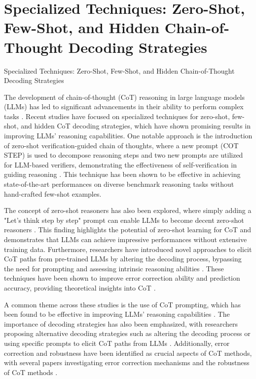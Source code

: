 \documentclass[conference]{IEEEtran}
\begin{document}
\section{Specialized Techniques: Zero-Shot, Few-Shot, and Hidden Chain-of-Thought Decoding Strategies}
Specialized Techniques: Zero-Shot, Few-Shot, and Hidden Chain-of-Thought Decoding Strategies

The development of chain-of-thought (CoT) reasoning in large language models (LLMs) has led to significant advancements in their ability to perform complex tasks \cite{b1}. Recent studies have focused on specialized techniques for zero-shot, few-shot, and hidden CoT decoding strategies, which have shown promising results in improving LLMs' reasoning capabilities. One notable approach is the introduction of zero-shot verification-guided chain of thoughts, where a new prompt (COT STEP) is used to decompose reasoning steps and two new prompts are utilized for LLM-based verifiers, demonstrating the effectiveness of self-verification in guiding reasoning \cite{b2}. This technique has been shown to be effective in achieving state-of-the-art performances on diverse benchmark reasoning tasks without hand-crafted few-shot examples.

The concept of zero-shot reasoners has also been explored, where simply adding a "Let's think step by step" prompt can enable LLMs to become decent zero-shot reasoners \cite{b3}. This finding highlights the potential of zero-shot learning for CoT and demonstrates that LLMs can achieve impressive performances without extensive training data. Furthermore, researchers have introduced novel approaches to elicit CoT paths from pre-trained LLMs by altering the decoding process, bypassing the need for prompting and assessing intrinsic reasoning abilities \cite{b4}. These techniques have been shown to improve error correction ability and prediction accuracy, providing theoretical insights into CoT \cite{b5}.

A common theme across these studies is the use of CoT prompting, which has been found to be effective in improving LLMs' reasoning capabilities \cite{b6}. The importance of decoding strategies has also been emphasized, with researchers proposing alternative decoding strategies such as altering the decoding process or using specific prompts to elicit CoT paths from LLMs \cite{b7}. Additionally, error correction and robustness have been identified as crucial aspects of CoT methods, with several papers investigating error correction mechanisms and the robustness of CoT methods \cite{b8}.
\end{document}

